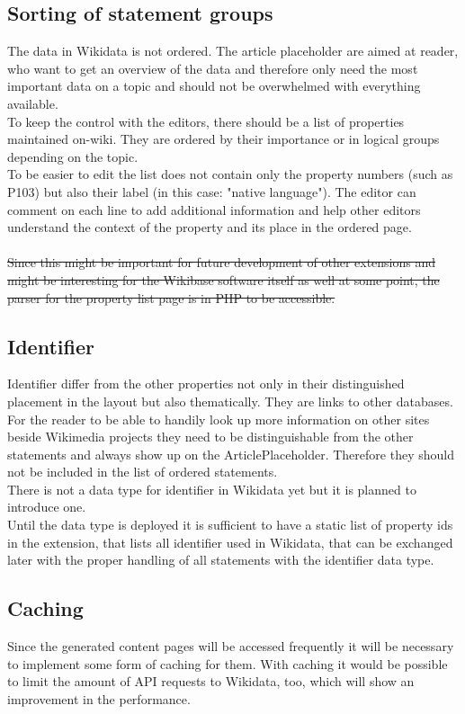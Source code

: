 \subsection{Sorting of statement groups }
The data in Wikidata is not ordered. The article placeholder are aimed at reader, who want to get an overview of the data and therefore only need the most important data on a topic and should not be overwhelmed with everything available. 
\\
To keep the control with the editors, there should be a list of properties maintained on-wiki. They are ordered by their importance or in logical groups depending on the topic. \\
To be easier to edit the list does not contain only the property numbers (such as P103) but also their label (in this case: "native language"). The editor can comment on each line to add additional information and help other editors understand the context of the property and its place in the ordered page. \\
\\
\st{Since this might be important for future development of other extensions and might be interesting for the Wikibase software itself as well at some point, the parser for the property list page is in PHP to be accessible.}  \\

\subsection {Identifier}
Identifier differ from the other properties not only in their distinguished placement in the layout but also thematically. They are links to other databases. For the reader to be able to handily look up more information on other sites beside Wikimedia projects they need to be distinguishable from the other statements and always show up on the ArticlePlaceholder. Therefore they should not be included in the list of ordered statements. \\
There is not a data type for identifier in Wikidata yet but it is planned to introduce one. \\
Until the data type is deployed it is sufficient to have a static list of property ids in the extension, that lists all identifier used in Wikidata, that can be exchanged later with the proper handling of all statements with the identifier data type. 

\subsection{Caching}
Since the generated content pages will be accessed frequently  it will be necessary to implement some form of caching for them. With caching it would be possible to limit the amount of API requests to Wikidata, too, which will show an improvement in the performance. 

